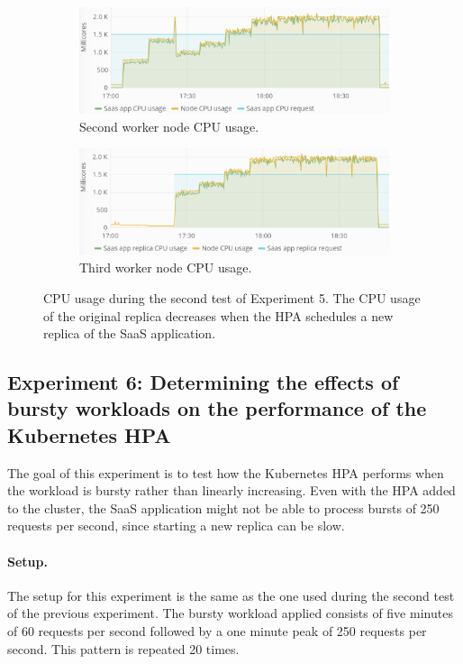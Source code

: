 \begin{figure}
\centering
\begin{subfigure}[b]{\columnwidth}
\centering
\includegraphics[width=0.70\columnwidth]{Images/Experiments/CPU/Grafana/cpu-saas-hpa-li-1.PNG}
\caption{Second worker node CPU usage.}
\label{fig:cpu-saas-hpa-li-1}
\end{subfigure}
\hfill
\begin{subfigure}[b]{\columnwidth}
\centering
\includegraphics[width=0.70\columnwidth]{Images/Experiments/CPU/Grafana/cpu-saas-hpa-li-2.PNG}
\caption{Third worker node CPU usage.}
\label{fig:cpu-saas-hpa-li-2}
\end{subfigure}
\hfill
\vspace*{-7mm}
\caption{CPU usage during the second test of Experiment 5. The CPU usage of the original replica decreases when the HPA schedules a new replica of the SaaS application.}
\label{fig:cpu-cas-hpa-li-2}
\end{figure}

\subsection{Experiment 6: Determining the effects of bursty workloads on the performance of the Kubernetes HPA}
The goal of this experiment is to test how the Kubernetes HPA performs when the workload is bursty rather than linearly increasing. Even with the HPA added to the cluster, the SaaS application might not be able to process bursts of 250 requests per second, since starting a new replica can be slow. %


\paragraph{Setup.}
The setup for this experiment is the same as the one used during the second test of the previous experiment. The bursty workload applied consists of five minutes of 60 requests per second followed by a one minute peak of 250 requests per second. This pattern is repeated 20 times.  

